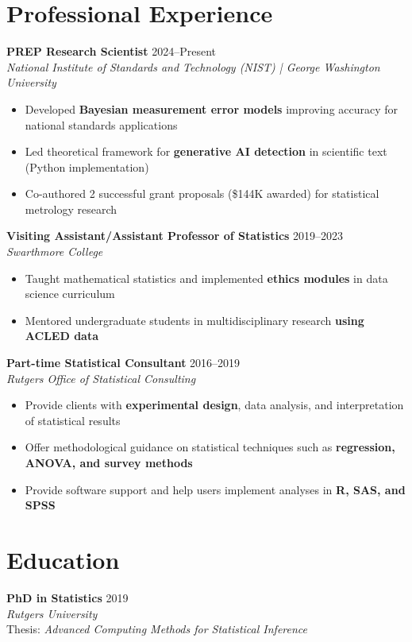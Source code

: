 \documentclass[10pt]{article}
\begin{document}
\section*{Professional Experience}
\textbf{PREP Research Scientist} \hfill 2024--Present \\
\textit{National Institute of Standards and Technology (NIST) | George Washington University}
\begin{itemize}[leftmargin=*,topsep=2pt,itemsep=1pt]
    \item Developed \textbf{Bayesian measurement error models} improving accuracy for national standards applications 
    \item Led theoretical framework for \textbf{generative AI detection} in scientific text (Python implementation) 
    \item Co-authored 2 successful grant proposals (\$144K awarded) for statistical metrology research
\end{itemize}

\noindent\textbf{Visiting Assistant/Assistant Professor of Statistics} \hfill 2019--2023 \\
\textit{Swarthmore College}
\begin{itemize}[leftmargin=*,topsep=2pt,itemsep=1pt]
    \item Taught mathematical statistics and implemented \textbf{ethics modules} in data science curriculum
    \item Mentored undergraduate students in multidisciplinary research \textbf{using ACLED data}  
\end{itemize}

\noindent\textbf{Part-time Statistical Consultant} \hfill 2016--2019 \\
\textit{Rutgers Office of Statistical Consulting}
\begin{itemize}[leftmargin=*,topsep=2pt,itemsep=1pt]
    \item Provide clients with \textbf{experimental design}, data analysis, and interpretation of statistical results
    \item Offer methodological guidance on statistical techniques such as \textbf{regression, ANOVA, and survey methods}
    \item Provide software support and help users implement analyses in \textbf{R, SAS, and SPSS}
\end{itemize}

\vspace{-1mm}
\section*{Education}
\textbf{PhD in Statistics} \hfill 2019 \\
\textit{Rutgers University} \\
Thesis: \textit{Advanced Computing Methods for Statistical Inference} \\
\end{document}
